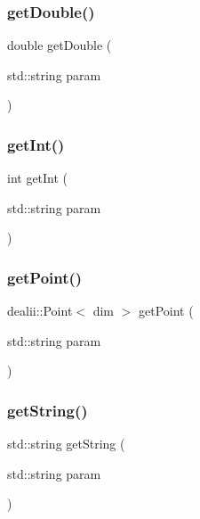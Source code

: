 \mbox{\label{classparameters_class_a40b9baa33a85fa60f5df2996d7dec98b}} 
\subsubsection{\texorpdfstring{getDouble()}{getDouble()}}
{\footnotesize\ttfamily double get\+Double (\begin{DoxyParamCaption}\item[{std\+::string}]{param }\end{DoxyParamCaption})}

\mbox{\label{classparameters_class_aa97dc7db4ec450afd1cb8bd0d8e00d12}} 
\subsubsection{\texorpdfstring{getInt()}{getInt()}}
{\footnotesize\ttfamily int get\+Int (\begin{DoxyParamCaption}\item[{std\+::string}]{param }\end{DoxyParamCaption})}

\mbox{\label{classparameters_class_ab98c50b2209c80346a3e6efdd71589b5}} 
\subsubsection{\texorpdfstring{getPoint()}{getPoint()}}
{\footnotesize\ttfamily dealii\+::\+Point$<$ dim $>$ get\+Point (\begin{DoxyParamCaption}\item[{std\+::string}]{param }\end{DoxyParamCaption})}

\mbox{\label{classparameters_class_a988c0deb4c2cf7e8ed80e39498c1eb58}} 
\subsubsection{\texorpdfstring{getString()}{getString()}}
{\footnotesize\ttfamily std\+::string get\+String (\begin{DoxyParamCaption}\item[{std\+::string}]{param }\end{DoxyParamCaption})}

